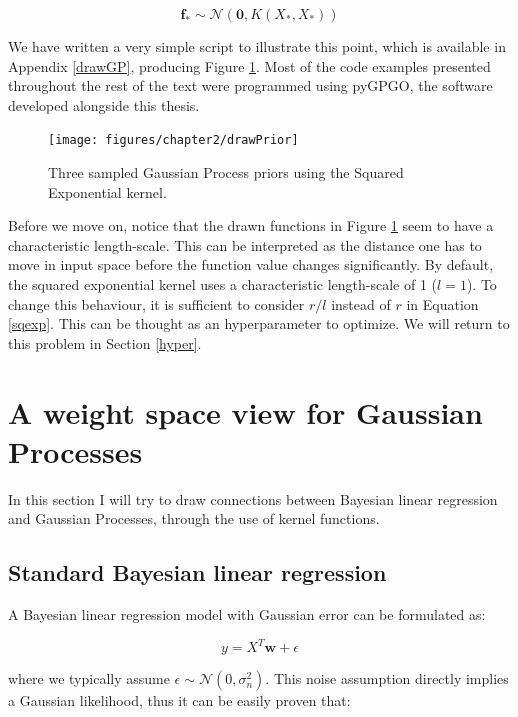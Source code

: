 \documentclass[10pt,a4paper,twoside]{book}
\begin{document}
\begin{equation}
\label{fprior}
\boldsymbol{f_*} \sim \mathcal{N}\left(\boldsymbol{0}, K(X_*, X_*)\right)
\end{equation}


We have written a very simple script to illustrate this point, which is available in Appendix \ref{drawGP}, producing Figure \ref{fig:drawPrior}. Most of the code examples presented throughout the rest of the text were programmed using pyGPGO, the software developed alongside this thesis.\\

\begin{figure}
\caption{Three sampled Gaussian Process priors using the Squared Exponential kernel.}
\label{fig:drawPrior}
\texttt{[image: figures/chapter2/drawPrior]}
\end{figure}

Before we move on, notice that the drawn functions in Figure \ref{fig:drawPrior} seem to have a characteristic length-scale. This can be interpreted as the distance one has to move in input space before the function value changes significantly. By default, the squared exponential kernel uses a characteristic length-scale of 1 ($l = 1$). To change this behaviour, it is sufficient to consider $r/l$ instead of $r$ in Equation \ref{sqexp}. This can be thought as an hyperparameter to optimize. We will return to this problem in Section \ref{hyper}.

\section{A weight space view for Gaussian Processes}

In this section I will try to draw connections between Bayesian linear regression \cite{Bolstad2007} and  Gaussian Processes, through the use of kernel functions. 

\subsection{Standard Bayesian linear regression}

A Bayesian linear regression model with Gaussian error can be formulated as:

\begin{equation}
\label{linearmodel}
y = X^T \boldsymbol{w} + \epsilon
\end{equation} 

where we typically assume $\epsilon \sim \mathcal{N}(0, \sigma_n^2)$. This noise assumption directly implies a Gaussian likelihood, thus it can be easily proven that:
\end{document}
